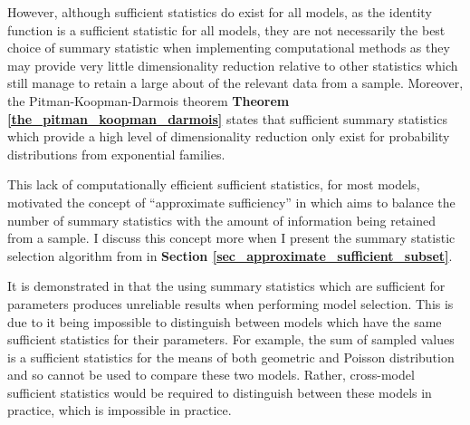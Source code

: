 \documentclass[bibliography=totoc,11pt,a4paper,margin=0]{article}
\theoremstyle{break}
\begin{document}
  \par However, although sufficient statistics do exist for all models, as the identity function is a sufficient statistic for all models, they are not necessarily the best choice of summary statistic when implementing computational methods as they may provide very little dimensionality reduction relative to other statistics which still manage to retain a large about of the relevant data from a sample. Moreover, the Pitman-Koopman-Darmois theorem \textbf{Theorem \ref{the_pitman_koopman_darmois}} states that sufficient summary statistics which provide a high level of dimensionality reduction only exist for probability distributions from exponential families.

  \par This lack of computationally efficient sufficient statistics, for most models, motivated the concept of ``approximate sufficiency'' in \cite[]{Approximately_sufficient_statistics_and_bayesian_computation} which aims to balance the number of summary statistics with the amount of information being retained from a sample. I discuss this concept more when I present the summary statistic selection algorithm from \cite[]{Approximately_sufficient_statistics_and_bayesian_computation} in \textbf{Section \ref{sec_approximate_sufficient_subset}}.

  \par It is demonstrated in \cite[]{on_model_selection_with_summary_statistics} that the using summary statistics which are sufficient for parameters produces unreliable results when performing model selection. This is due to it being impossible to distinguish between models which have the same sufficient statistics for their parameters. For example, the sum of sampled values is a sufficient statistics for the means of both geometric and Poisson distribution and so cannot be used to compare these two models. Rather, cross-model sufficient statistics would be required to distinguish between these models in practice, which is impossible in practice. %
\end{document}
